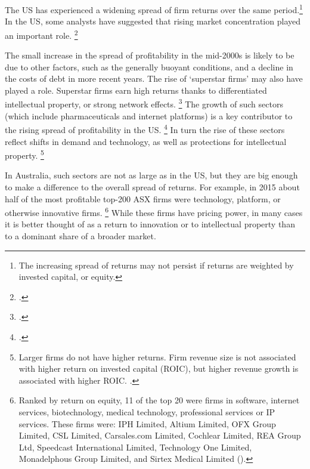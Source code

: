 
The US has experienced a widening spread of firm returns over the same period.\footnote{\textcite{Econtoohigh2016} The increasing spread of returns may not persist if returns are weighted by invested capital, or equity.}
In the US, some analysts have suggested that rising market concentration played an important role.%
    \footcites{CEAcompetitionbriefmay2016}{Ganapati_concen_2017}


The small increase in the spread of profitability in the mid-2000s is likely to be due to other factors, such as the generally buoyant conditions, and a decline in the costs of debt in more recent years. The rise of `superstar firms' may also have played a role. Superstar firms earn high returns thanks to differentiated intellectual property, or strong network effects.%
    \footcites{UNCTAD_2017}{AutorDorn2017}
The growth of such sectors (which include pharmaceuticals and internet platforms) is a key contributor to the rising spread of profitability in the US.%
    \footcite[][71--76]{Koller_ROIC_2010}
In turn the rise of these sectors reflect shifts in demand and technology, as well as protections for intellectual property.%
    \footnote{Larger firms do not have higher returns. Firm revenue size is not associated with higher return on invested capital (ROIC), but higher revenue growth is associated with higher ROIC. \textcite{Koller_ROIC_2010}.}

In Australia, such sectors are not as large as in the US, but they are big enough to make a difference to the overall spread of returns. For example, in 2015 about half of the most profitable top-200 ASX firms were technology, platform, or otherwise innovative firms.%
    \footnote{Ranked by return on equity, 11 of the top 20 were firms in software, internet services, biotechnology, medical technology, professional services or IP services. These firms were: IPH Limited, Altium Limited, OFX Group Limited, CSL Limited, Carsales.com Limited, Cochlear Limited, REA Group Ltd, Speedcast International Limited, Technology One Limited, Monadelphous Group Limited, and Sirtex Medical Limited (\textcite{Morningstar2017}).}
While these firms  have pricing power, in many cases it is better thought of as a return to innovation or to intellectual property than to a dominant share of a broader market.%

